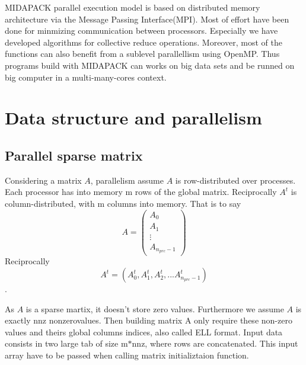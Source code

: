 M\-I\-D\-A\-P\-A\-C\-K parallel execution model is based on distributed memory architecture via the Message Passing Interface(\-M\-P\-I). Most of effort have been done for minmizing communication between processors. Especially we have developed algorithms for collective reduce operations. Moreover, most of the functions can also benefit from a sublevel parallellism using Open\-M\-P. Thus programs build with M\-I\-D\-A\-P\-A\-C\-K can works on big data sets and be runned on big computer in a multi-\/many-\/cores context.

\par
 \section{Data structure and parallelism}\label{data_struct_parall}
\hypertarget{data_struct_parall_input_struct}{}\subsection{Parallel sparse matrix}\label{data_struct_parall_input_struct}
Considering a matrix $A$, parallelism assume $A$ is row-\/distributed over processes. Each processor has into memory m rows of the global matrix. Reciprocally $A^t$ is column-\/distributed, with m columns into memory. That is to say \[ A = \left( \begin{array}{c}A_0 \\A_1\\ \vdots \\ A_{n_{prc}-1} \end{array} \right) \] Reciprocally \[ A^t=(A_0^t, A_1^t, A_2^t, ... A_{n_{prc}-1}^t) \].

As $A$ is a sparse martix, it doesn't store zero values. Furthermore we assume $A$ is exactly nnz nonzerovalues. Then building matrix A only require these non-\/zero values and theirs global columns indices, also called E\-L\-L format. Input data consists in two large tab of size m$\ast$nnz, where rows are concatenated. This input array have to be passed when calling matrix initializtaion function.

